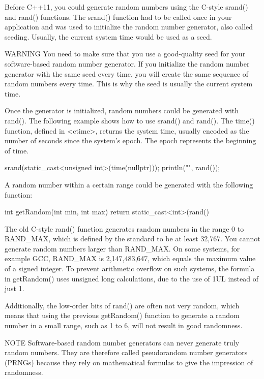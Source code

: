 Before C++11, you could generate random numbers using the C-style srand() and rand() functions. The srand() function had to be called once in your application and was used to initialize the random number generator, also called seeding. Usually, the current system time would be used as a seed.

\begin{myWarning}{WARNING}
You need to make sure that you use a good-quality seed for your software-based random number generator. If you initialize the random number generator with the same seed every time, you will create the same sequence of random numbers every time. This is why the seed is usually the current system time.
\end{myWarning}

Once the generator is initialized, random numbers could be generated with rand(). The following example shows how to use srand() and rand(). The time() function, defined in <ctime>, returns the system time, usually encoded as the number of seconds since the system’s epoch. The epoch represents the beginning of time.

\begin{cpp}
srand(static_cast<unsigned int>(time(nullptr)));
println("{}", rand());
\end{cpp}

A random number within a certain range could be generated with the following function:

\begin{cpp}
int getRandom(int min, int max)
{
    return static_cast<int>(rand() %
}
\end{cpp}

The old C-style rand() function generates random numbers in the range 0 to RAND\_MAX, which is defined by the standard to be at least 32,767. You cannot generate random numbers larger than RAND\_MAX. On some systems, for example GCC, RAND\_MAX is 2,147,483,647, which equals the maximum value of a signed integer. To prevent arithmetic overflow on such systems, the formula in getRandom() uses unsigned long calculations, due to the use of 1UL instead of just 1.

Additionally, the low-order bits of rand() are often not very random, which means that using the previous getRandom() function to generate a random number in a small range, such as 1 to 6, will not result in good randomness.

\begin{myNotic}{NOTE}
Software-based random number generators can never generate truly random numbers. They are therefore called pseudorandom number generators (PRNGs) because they rely on mathematical formulas to give the impression of randomness.
\end{myNotic}

